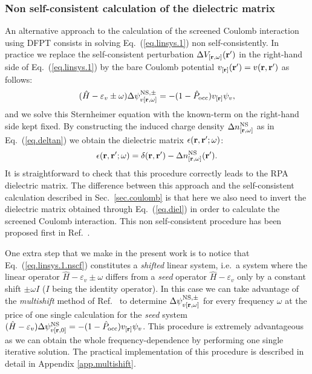 \documentclass[twocolumn,prb,showpacs,superscriptaddress]{revtex4}
\def\w{\omega}
\def\H{\hat{H}}
\def\P{\hat{P}_{\rm occ}}
\def\E{\varepsilon}
\def\r{{\bf r}}
\def\rp{{\bf r^\prime}}
\begin{document}
\subsubsection{Non self-consistent calculation of the dielectric matrix}\label{sec.diel.nscf}

An alternative approach to the calculation of the screened Coulomb interaction
using DFPT consists in solving Eq.\ (\ref{eq.linsys.1}) non self-consistently.
In practice we replace the self-consistent perturbation $\Delta V_{[\r,\w]}(\rp)$
in the right-hand side of Eq.\ (\ref{eq.linsys.1}) by the bare Coulomb potential
$v_{[\r]}(\rp)=v(\r,\rp)$ as follows:
  \begin{equation}\label{eq.linsys.1.nscf}
  (\H-\E_v\pm\w) \Delta \psi^{{\rm NS},\pm}_{v[\r,\w]}  = -(1-\P)  v_{[\r]} \psi_v, 
  \end{equation}
and we solve this Sternheimer equation with the known-term on the right-hand side
kept fixed. By constructing the induced charge density $\Delta n^{\rm NS}_{[\r,\w]}$ as in Eq.\ (\ref{eq.deltan})
we obtain the dielectric matrix $\epsilon(\r,\rp;\w)$:
  \begin{equation}\label{eq.diel}
  \epsilon(\r,\rp;\w) = \delta(\r,\rp) - \Delta n^{\rm NS}_{[\r,\w]}(\rp).
  \end{equation}
It is straightforward to check that this procedure correctly leads to the RPA
dielectric matrix.\cite{hl86-prb}
The difference between this approach and the self-consistent calculation described in
Sec.\ \ref{sec.coulomb} is that here we also need to invert the dielectric matrix obtained
through Eq.\ (\ref{eq.diel}) in order to calculate the screened Coulomb interaction.
This non self-consistent procedure has been proposed first in Ref.\ .

One extra step that we make in the present work is to notice that Eq.\ (\ref{eq.linsys.1.nscf})
constitutes a {\it shifted} linear system, i.e.\ a system where the linear operator
$\H-\E_v\pm\w$ differs from a {\it seed} operator $\H-\E_v$ only by a constant shift $\pm\w I$ 
($I$ being the identity operator). 
In this case we can take
advantage of the {\it multishift} method of Ref.\ 
to determine $\Delta \psi^{{\rm NS},\pm}_{v[\r,\w]}$ for every frequency $\w$
at the price of one single calculation for the {\it seed} system $(\H-\E_v) \Delta \psi^{{\rm NS}}_{v[\r,0]}  = -(1-\P)  v_{[\r]} \psi_v$.
This procedure is extremely advantageous as we can obtain the whole frequency-dependence 
by performing one single iterative solution. 
The practical implementation of this procedure is described in detail in Appendix \ref{app.multishift}.
\end{document}
